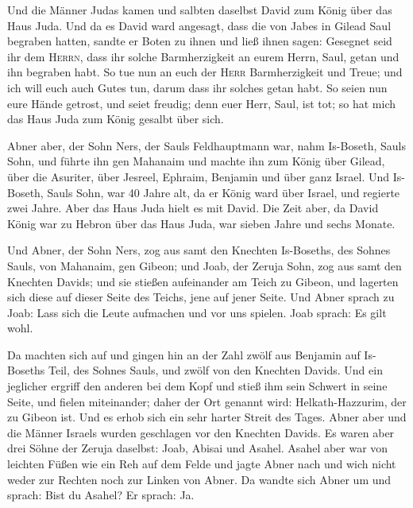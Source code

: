  Und die Männer Judas kamen und salbten daselbst David zum
König über das Haus Juda. Und da es David ward angesagt, dass die von
Jabes in Gilead Saul begraben hatten,  sandte er Boten zu
ihnen und ließ ihnen sagen: Gesegnet seid ihr dem \textsc{Herrn}, dass
ihr solche Barmherzigkeit an eurem Herrn, Saul, getan und ihn begraben
habt.  So tue nun an euch der \textsc{Herr} Barmherzigkeit
und Treue; und ich will euch auch Gutes tun, darum dass ihr solches
getan habt.  So seien nun eure Hände getrost, und seiet
freudig; denn euer Herr, Saul, ist tot; so hat mich das Haus Juda zum
König gesalbt über sich.

 Abner aber, der Sohn Ners, der Sauls Feldhauptmann war,
nahm Is-Boseth, Sauls Sohn, und führte ihn gen Mahanaim 
und machte ihn zum König über Gilead, über die Asuriter, über Jesreel,
Ephraim, Benjamin und über ganz Israel.  Und Is-Boseth,
Sauls Sohn, war 40 Jahre alt, da er König ward über Israel, und regierte
zwei Jahre. Aber das Haus Juda hielt es mit David.  Die
Zeit aber, da David König war zu Hebron über das Haus Juda, war sieben
Jahre und sechs Monate.

 Und Abner, der Sohn Ners, zog aus samt den Knechten
Is-Boseths, des Sohnes Sauls, von Mahanaim, gen Gibeon; 
und Joab, der Zeruja Sohn, zog aus samt den Knechten Davids; und sie
stießen aufeinander am Teich zu Gibeon, und lagerten sich diese auf
dieser Seite des Teichs, jene auf jener Seite.  Und Abner
sprach zu Joab: Lass sich die Leute aufmachen und vor uns spielen. Joab
sprach: Es gilt wohl.

 Da machten sich auf und gingen hin an der Zahl zwölf aus
Benjamin auf Is-Boseths Teil, des Sohnes Sauls, und zwölf von den
Knechten Davids.  Und ein jeglicher ergriff den anderen
bei dem Kopf und stieß ihm sein Schwert in seine Seite, und fielen
miteinander; daher der Ort genannt wird: Helkath-Hazzurim, der zu Gibeon
ist.  Und es erhob sich ein sehr harter Streit des Tages.
Abner aber und die Männer Israels wurden geschlagen vor den Knechten
Davids.  Es waren aber drei Söhne der Zeruja daselbst:
Joab, Abisai und Asahel. Asahel aber war von leichten Füßen wie ein Reh
auf dem Felde  und jagte Abner nach und wich nicht weder
zur Rechten noch zur Linken von Abner.  Da wandte sich
Abner um und sprach: Bist du Asahel? Er sprach: Ja.

